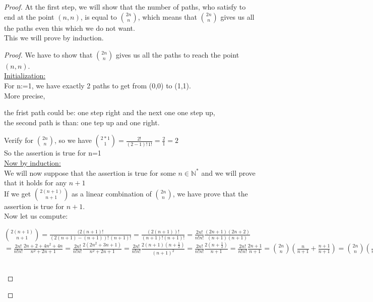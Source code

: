 \documentclass[a4paper,12pt,oneside]{article}
\begin{document}
\begin{proof}
At the first step, we will show that the number of paths, who satisfy to end at the point $(n,n)$, is equal to $\binom{2n}{n}$, which means that $\binom{2n}{n}$ gives us all the paths even this which we do not want.
\\
This we will prove by induction.
\begin{proof}
We have to show that $\binom{2n}{n}$ gives us all the paths to reach the point $(n,n)$.\vspace{0.3cm}\\
\underline{Initialization:}
\\ For n:=1, we have exactly 2 paths to get from (0,0)  to (1,1).
\\ More precise, 
\begin{center}
the frist path could be: one step right and the next one one step up, 
\\the second path is than: one tep up and one right.
\end{center}
\vspace{0.3cm}
Verify for  $\binom{2n}{n}$, so we have  $\binom{2*1}{1}=\frac{2!}{(2-1)!\,1!}=\frac{2}{1}=2$\
\vspace{0.3cm} \\ So the assertion is true for n=1
\vspace{0.2cm}\\
\underline{Now by induction:}
\vspace {0.1cm}\\ We will now suppose that the assertion is true for some $n\in\mathbb{N^*}$ and we will prove that it holds for any $n+1$ \\If we get $\binom{2(n+1)}{n+1}$ as a linear combination of $\binom{2n}{n}$, we have prove that the assertion is true for $n+1$.\vspace{0.3cm}\\
Now let us compute:\vspace{0.2cm}\\
\begin{center}
 $\binom{2(n+1)}{n+1}=\frac{(2(n+1)!}{(2(n+1)-(n+1))!\,(n+1)!}
=\frac{(2(n+1))!}{(n+1)!(n+1)!}=\frac{2n!}{n!n!}\frac{(2n+1)(2n+2)}{(n+1)(n+1)}$\\$=\frac{2n!}{n!n!}\frac{2n+2+4n^2+4n}{n^2+2n+1}=\frac{2n!}{n!n!}\frac{2(2n^2+3n+1)}{n^2+2n+1}=\frac{2n!}{n!n!}\frac{2(n+1)(n+\frac{1}{2})}{(n+1)^2}=\frac{2n!}{n!n!}\frac{2(n+\frac{1}{2})}{n+1}=\frac{2n!}{n!n!}\frac{2n+1}{n+1}=\binom{2n}{n}(\frac{n}{n+1}+\frac{n+1}{n+1})=\binom{2n}{n}(\frac{n}{n+1}+1)=\frac{n}{n+1}\binom{2n}{n}+\binom{2n}{n}$\

\end{center}
\end{proof}
\end{proof}
\end{document}
